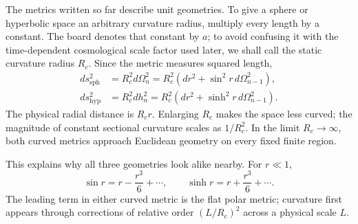 The metrics written so far describe unit geometries. To give a sphere or hyperbolic space an arbitrary curvature radius, multiply every length by a constant. The board denotes that constant by \(a\); to avoid confusing it with the time-dependent cosmological scale factor used later, we shall call the static curvature radius \(R_c\). Since the metric measures squared length,
\begin{align}
ds_{\mathrm{sph}}^2
  &=R_c^2d\Omega_n^2
   =R_c^2\left(dr^2+\sin^2r\,d\Omega_{n-1}^2\right),\\
ds_{\mathrm{hyp}}^2
  &=R_c^2dh_n^2
   =R_c^2\left(dr^2+\sinh^2r\,d\Omega_{n-1}^2\right).
\label{eq:c03-scaled-curvature}
\end{align}
The physical radial distance is \(R_cr\). Enlarging \(R_c\) makes the space less curved; the magnitude of constant sectional curvature scales as \(1/R_c^2\). In the limit \(R_c\to\infty\), both curved metrics approach Euclidean geometry on every fixed finite region.

\begin{classroomqa}
\end{classroomqa}

This explains why all three geometries look alike nearby. For \(r\ll1\),
\begin{equation}
\sin r=r-\frac{r^3}{6}+\cdots,
\qquad
\sinh r=r+\frac{r^3}{6}+\cdots.
\end{equation}
The leading term in either curved metric is the flat polar metric; curvature first appears through corrections of relative order \((L/R_c)^2\) across a physical scale \(L\).

\begin{classroomqa}
\end{classroomqa}

